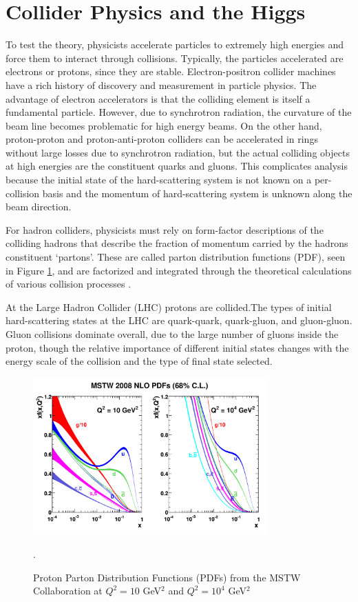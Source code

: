 \section{Collider Physics and the Higgs} 

To test the theory, physicists accelerate particles to extremely high energies and force
them to interact through collisions. Typically, the particles accelerated are
electrons or protons, since they are stable. Electron-positron collider
machines have a rich history of discovery and measurement in particle physics.
The advantage of electron accelerators is that the colliding element is itself
a fundamental particle. However, due to synchrotron radiation, the curvature of the
beam line becomes problematic for high energy beams.  On the other
hand, proton-proton and proton-anti-proton colliders can be accelerated in rings without large losses
due to synchrotron radiation, but the actual colliding objects at high
energies are the constituent quarks and gluons. This complicates analysis
because the initial state of the hard-scattering system is not known on a per-collision
basis and the momentum of hard-scattering system is unknown along the beam direction.

For hadron colliders, physicists must rely on form-factor descriptions of the colliding hadrons
that describe the fraction of momentum carried by the
hadrons constituent `partons'.  These are called parton distribution
functions (PDF), seen in Figure \ref{figure:theory_pdf}, and are factorized
and integrated through the theoretical calculations of various collision processes \cite{1985.Collins.factorization-theorem}.

At the Large Hadron Collider (LHC) protons are collided.The types of initial hard-scattering states at the LHC are quark-quark, quark-gluon, and gluon-gluon. Gluon collisions dominate overall,
  due to the large number of gluons inside the proton, though the relative importance of different initial states changes with the
  energy scale of the collision and the type of final state selected.  

\begin{figure}[!t]
\centering 
\includegraphics[width=0.8\textwidth]{figs/theory/mstw2008nlo68cl_allpdfs.pdf}
\caption {Proton Parton Distribution Functions (PDFs) from the MSTW Collaboration at $Q^2 = 10$ GeV$^2$ and $Q^2 = 10^4$ GeV$^2$}.
\label{figure:theory_pdf}
\end{figure}

